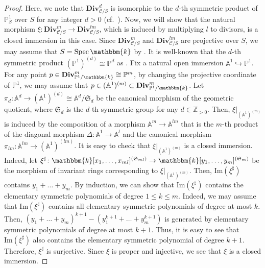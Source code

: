 \documentclass[12pt,twoside]{amsart}
\theoremstyle{definition}
\begin{document}
\begin{proof}
Here, we note that $\mathbf{Div}^{d}_{\mathcal{C}/S}$ is isomorphic to the $d$-th symmetric product of $\mathbb{P}^1_S$ over $S$ for any integer $d>0$ (cf.~\cite[Remark 9.3.9]{FGA}).
Now, we will show that the natural morphism $\xi\colon\mathbf{Div}^{m}_{\mathcal{C}/S}\to\mathbf{Div}^{lm}_{\mathcal{C}/S}$, which is induced by multiplying $l$ to divisors, is a closed immersion in this case.
Since $\mathbf{Div}^{m}_{\mathcal{C}/S}$ and $\mathbf{Div}^{lm}_{\mathcal{C}/S}$ are projective over $S$, we may assume that $S=\mathrm{Spec}\,\mathbbm{k}$ by \cite[Proposition 12.93]{gortz-wedhorn}.
It is well-known that the $d$-th symmetric product $(\mathbb{P}^1)^{(d)}\cong\mathbb{P}^d$ as \cite[Example 7.1.3 (1)]{FGA}.
Fix a natural open immersion $\mathbb{A}^1\hookrightarrow \mathbb{P}^1$.
For any point $p\in \mathbf{Div}^{m}_{\mathbb{P}^1/\mathbbm{k}}\cong\mathbb{P}^m$, by changing the projective coordinate of $\mathbb{P}^1$, we may assume that $p\in (\mathbb{A}^1)^{(m)}\subset \mathbf{Div}^{m}_{\mathbb{P}^1/\mathbbm{k}}$.
Let $\pi_d\colon \mathbb{A}^d\to (\mathbb{A}^1)^{(d)}\cong \mathbb{A}^d/\mathfrak{S}_d$ be the canonical morphism of the geometric quotient, where $\mathfrak{S}_d$ is the $d$-th symmetric group for any $d\in\mathbb{Z}_{>0}$.
Then, $\xi|_{(\mathbb{A}^1)^{(m)}}$ is induced by the composition of a morphism $\mathbb{A}^m\to \mathbb{A}^{lm}$ that is the $m$-th product of the diagonal morphism $\Delta\colon \mathbb{A}^1\to \mathbb{A}^l$ and the canonical morphism $\pi_{lm}\colon\mathbb{A}^{lm}\to (\mathbb{A}^1)^{(lm)}$.
It is easy to check that $\xi|_{(\mathbb{A}^1)^{(m)}}$ is a closed immersion.
Indeed, let $\xi^\sharp\colon\mathbbm{k}[x_1,\ldots,x_{ml}]^{(\mathfrak{S}_{ml})}\to \mathbbm{k}[y_1,\ldots,y_{m}]^{(\mathfrak{S}_{m})}$ be the morphism of invariant rings corresponding to $\xi|_{(\mathbb{A}^1)^{(m)}}$.
Then, $\mathrm{Im}(\xi^\sharp)$ contains $y_1+\ldots +y_m$.
By induction, we can show that $\mathrm{Im}(\xi^\sharp)$ contains the elementary symmetric polynomials of degree $1\le k\le m$.
Indeed, we may assume that $\mathrm{Im}(\xi^\sharp)$ contains all elementary symmetric polynomials of degree at most $k$.
Then, $(y_1+\ldots +y_m)^{k+1}-(y_1^{k+1}+\ldots +y_m^{k+1})$ is generated by elementary symmetric polynomials of degree at most $k+1$.
Thus, it is easy to see that $\mathrm{Im}(\xi^\sharp)$ also contains the elementary symmetric polynomial of degree $k+1$.
Therefore, $\xi^\sharp$ is surjective.
Since $\xi$ is proper and injective, we see that $\xi$ is a closed immersion.


\end{proof}
\end{document}
